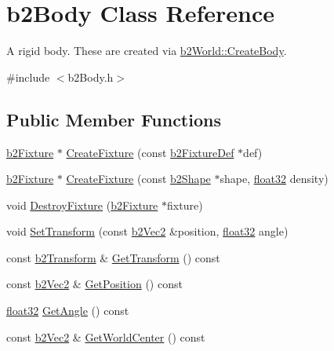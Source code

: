 \hypertarget{classb2_body}{}\section{b2\+Body Class Reference}
\label{classb2_body}


A rigid body. These are created via \mbox{\hyperlink{classb2_world_a2eb36e967e43294bfa03ec3d177c2dae}{b2\+World\+::\+Create\+Body}}.  




{\ttfamily \#include $<$b2\+Body.\+h$>$}

\subsection*{Public Member Functions}
\begin{DoxyCompactItemize}
\item 
\mbox{\hyperlink{classb2_fixture}{b2\+Fixture}} $\ast$ \mbox{\hyperlink{classb2_body_aa4892301e9b9d62ede5e93dad1743894}{Create\+Fixture}} (const \mbox{\hyperlink{structb2_fixture_def}{b2\+Fixture\+Def}} $\ast$def)
\item 
\mbox{\hyperlink{classb2_fixture}{b2\+Fixture}} $\ast$ \mbox{\hyperlink{classb2_body_a52d971867086d5db79769a62bbb70a60}{Create\+Fixture}} (const \mbox{\hyperlink{classb2_shape}{b2\+Shape}} $\ast$shape, \mbox{\hyperlink{b2_settings_8h_aacdc525d6f7bddb3ae95d5c311bd06a1}{float32}} density)
\item 
void \mbox{\hyperlink{classb2_body_a856d1df86b7bded91f02d8cfcaea1c2f}{Destroy\+Fixture}} (\mbox{\hyperlink{classb2_fixture}{b2\+Fixture}} $\ast$fixture)
\item 
void \mbox{\hyperlink{classb2_body_a4686f32bbce5723761e9719c706eca11}{Set\+Transform}} (const \mbox{\hyperlink{structb2_vec2}{b2\+Vec2}} \&position, \mbox{\hyperlink{b2_settings_8h_aacdc525d6f7bddb3ae95d5c311bd06a1}{float32}} angle)
\item 
const \mbox{\hyperlink{structb2_transform}{b2\+Transform}} \& \mbox{\hyperlink{classb2_body_afb316448e6e555ceb2df23ed216b2f53}{Get\+Transform}} () const
\item 
const \mbox{\hyperlink{structb2_vec2}{b2\+Vec2}} \& \mbox{\hyperlink{classb2_body_a7944dc953ac0cb1e00b32bc61b50e70d}{Get\+Position}} () const
\item 
\mbox{\hyperlink{b2_settings_8h_aacdc525d6f7bddb3ae95d5c311bd06a1}{float32}} \mbox{\hyperlink{classb2_body_a20b9c8d0d722edf3af281034d37bd534}{Get\+Angle}} () const
\item 
const \mbox{\hyperlink{structb2_vec2}{b2\+Vec2}} \& \mbox{\hyperlink{classb2_body_a3e14cfe61c63913ef7b0f719f7145318}{Get\+World\+Center}} () const

\end{DoxyCompactItemize}
